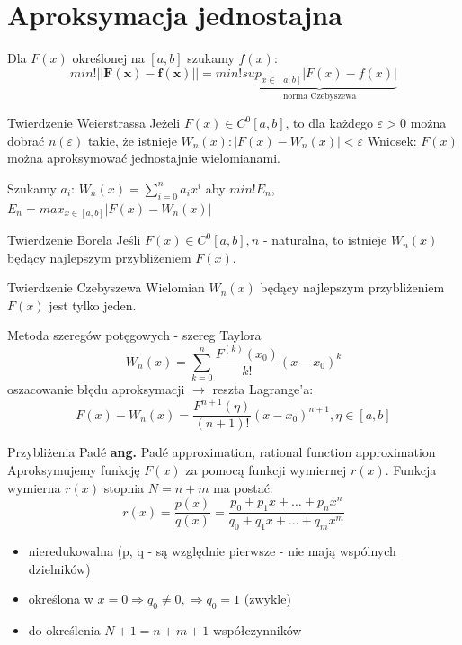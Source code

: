 \section{Aproksymacja jednostajna}
\begin{frame}
	Dla $F(x)$ określonej na $[a,b]$ szukamy $f(x)$:
    $$min! ||\mathbf{F(x)-f(x)}|| = min!\underbrace{sup_{x \in [a,b]}|F(x)-f(x)|}_{\text{norma Czebyszewa}}$$
\end{frame}
\begin{frame}
	\begin{block}{Twierdzenie Weierstrassa}
	Jeżeli $F(x) \in C^0[a,b]$, to dla każdego $\varepsilon>0$ można dobrać $n(\varepsilon)$ takie, że istnieje $W_n(x): |F(x)-W_n(x)|<\varepsilon$ \newline
    \newline Wniosek: $F(x)$ można aproksymować jednostajnie wielomianami.
	\end{block}
    Szukamy $a_i$:\newline
    $W_n(x) = \sum_{i=0}^{n}a_ix^i$ aby $min!E_n$, \newline
    $E_n = max_{x \in [a,b]} |F(x) - W_n(x)|$
\end{frame}
\begin{frame}
	\begin{block}{Twierdzenie Borela}
		Jeśli $F(x)\in C^0[a,b], n$ - naturalna, to istnieje $W_n(x)$ będący najlepszym przybliżeniem $F(x)$.
	\end{block}
    \begin{block}{Twierdzenie Czebyszewa}
    	Wielomian $W_n(x)$ będący najlepszym przybliżeniem $F(x)$ jest tylko jeden.
    \end{block}
\end{frame}
\begin{frame}{Metoda szeregów potęgowych - szereg Taylora}
	$$W_n(x) = \sum_{k=0}^{n}\frac{F^{(k)}(x_0)}{k!}(x-x_0)^k$$
    oszacowanie błędu aproksymacji $\rightarrow$ reszta Lagrange'a:
    $$F(x)-W_n(x) = \frac{F^{n+1}(\eta)}{(n+1)!}(x-x_0)^{n+1},\eta \in [a,b]$$
\end{frame}
\begin{frame}{Przybliżenia Padé}
	\textbf{ang.} Padé approximation, rational function approximation \newline
    \newline
    Aproksymujemy funkcję $F(x)$ za pomocą funkcji wymiernej $r(x)$.
    \newline
    Funkcja wymierna $r(x)$ stopnia $N = n+m$ ma postać:
    $$r(x) = \frac{p(x)}{q(x)} = \frac{p_0+p_1x+\ldots+p_nx^n}{q_0+q_1x+\ldots+q_mx^m}$$
    \begin{itemize}
    \item nieredukowalna (p, q - są względnie pierwsze - nie mają wspólnych dzielników)
    \item określona w $x=0\Rightarrow q_0 \not = 0, \Rightarrow q_0=1$ (zwykle)
    \item do określenia $N+1 = n+m+1$ współczynników
    \end{itemize}
\end{frame}
